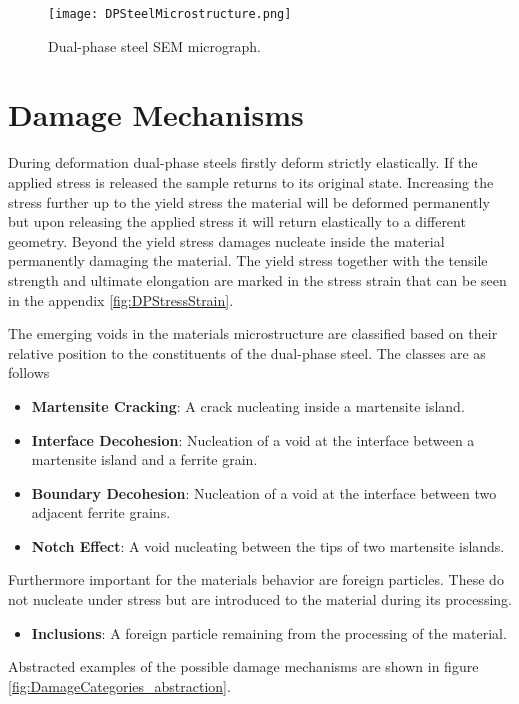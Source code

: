 \begin{figure}
\centering
  \texttt{[image: DPSteelMicrostructure.png]}
  \caption{Dual-phase steel SEM micrograph.}
  \label{fig:DPMicrostructure}
\end{figure}

\section{Damage Mechanisms}
During deformation dual-phase steels firstly deform strictly elastically. If the applied stress is released the sample returns to its original state. Increasing the stress further up to the yield stress the material will be deformed permanently but upon releasing the applied stress it will return elastically to a different geometry. Beyond the yield stress damages nucleate inside the material permanently damaging the material. The yield stress together with the tensile strength and ultimate elongation are marked in the stress strain that can be seen in the appendix \ref{fig:DPStressStrain}.

The emerging voids in the materials microstructure are classified based on their relative position to the constituents of the dual-phase steel. The classes are as follows
\begin{itemize}[label={}]
\item \textbf{Martensite Cracking}: A crack nucleating inside a martensite island.
\item \textbf{Interface Decohesion}: Nucleation of a void at the interface between a martensite island and a ferrite grain.
\item \textbf{Boundary Decohesion}: Nucleation of a void at the interface between two adjacent ferrite grains.
\item \textbf{Notch Effect}: A void nucleating between the tips of two martensite islands. 
\end{itemize}
Furthermore important for the materials behavior are foreign particles. These do not nucleate under stress but are introduced to the material during its processing.
\begin{itemize}[label={}]
\item \textbf{Inclusions}: A foreign particle remaining from the processing of the material. 
\end{itemize}
Abstracted examples of the possible damage mechanisms are shown in figure \ref{fig:DamageCategories_abstraction}. \\


